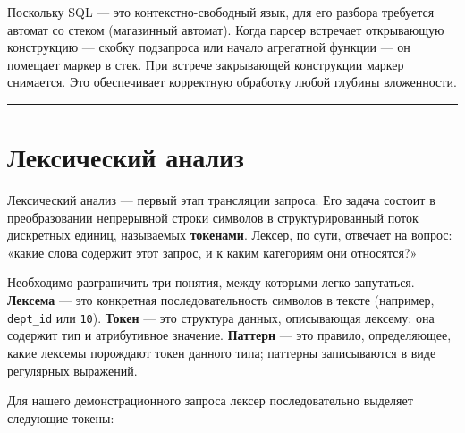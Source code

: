 \documentclass[a4paper,12pt]{report}
\begin{document}
Поскольку SQL — это контекстно-свободный язык, для его разбора требуется автомат со стеком (магазинный автомат). Когда парсер встречает открывающую конструкцию — скобку подзапроса или начало агрегатной функции — он помещает маркер в стек. При встрече закрывающей конструкции маркер снимается. Это обеспечивает корректную обработку любой глубины вложенности.

\vspace{0.5cm}\hrule\vspace{0.5cm}

\section{Лексический анализ}

Лексический анализ — первый этап трансляции запроса. Его задача состоит в преобразовании непрерывной строки символов в структурированный поток дискретных единиц, называемых \textbf{токенами}. Лексер, по сути, отвечает на вопрос: «какие слова содержит этот запрос, и к каким категориям они относятся?»

Необходимо разграничить три понятия, между которыми легко запутаться. \textbf{Лексема} — это конкретная последовательность символов в тексте (например, \texttt{dept\_id} или \texttt{10}). \textbf{Токен} — это структура данных, описывающая лексему: она содержит тип и атрибутивное значение. \textbf{Паттерн} — это правило, определяющее, какие лексемы порождают токен данного типа; паттерны записываются в виде регулярных выражений.

Для нашего демонстрационного запроса лексер последовательно выделяет следующие токены:
\end{document}

